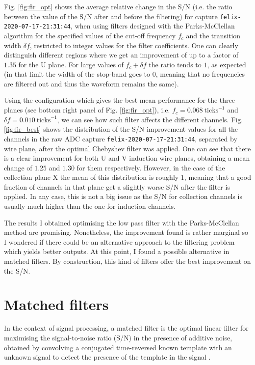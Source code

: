 Fig. \ref{fig:fir_opt} shows the average relative change in the S/N (i.e. the ratio between the value of the S/N after and before the filtering) for capture \texttt{felix-2020-07-17-21:31:44}, when using filters designed with the Parks-McClellan algorithm for the specified values of the cut-off frequency $f_{c}$ and the transition width $\delta f$, restricted to integer values for the filter coefficients. One can clearly distinguish different regions where we get an improvement of up to a factor of $1.35$ for the U plane. For large values of $f_{c} + \delta f$ the ratio tends to $1$, as expected (in that limit the width of the stop-band goes to $0$, meaning that no frequencies are filtered out and thus the waveform remains the same).

Using the configuration which gives the best mean performance for the three planes (see bottom right panel of Fig. \ref{fig:fir_opt}), i.e. $f_{c} = 0.068 \ \mathrm{ticks}^{-1}$ and $\delta f = 0.010 \ \mathrm{ticks}^{-1}$, we can see how such filter affects the different channels. Fig. \ref{fig:fir_best} shows the distribution of the S/N improvement values for all the channels in the raw ADC capture \texttt{felix-2020-07-17-21:31:44}, separated by wire plane, after the optimal Chebyshev filter was applied. One can see that there is a clear improvement for both U and V induction wire planes, obtaining a mean change of $1.25$ and $1.30$ for them respectively. However, in the case of the collection plane X the mean of this distribution is roughly $1$, meaning that a good fraction of channels in that plane get a slightly worse S/N after the filter is applied. In any case, this is not a big issue as the S/N for collection channels is usually much higher than the one for induction channels.

The results I obtained optimising the low pass filter with the Parks-McClellan method are promising. Nonetheless, the improvement found is rather marginal so I wondered if there could be an alternative approach to the filtering problem which yields better outputs. At this point, I found a possible alternative in matched filters. By construction, this kind of filters offer the best improvement on the S/N.

\section{Matched filters}
\label{sec:2.4}

In the context of signal processing, a matched filter is the optimal linear filter for maximising the signal-to-noise ratio (S/N) in the presence of additive noise, obtained by convolving a conjugated time-reversed known template with an unknown signal to detect the presence of the template in the signal \cite{Turin1960}.


